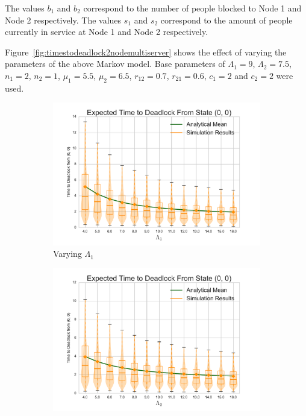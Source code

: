 \documentclass{article}
\numberwithin{equation}{section}
\begin{document}
The values $b_1$ and $b_2$ correspond to the number of people blocked to Node 1 and Node 2 respectively.
The values $s_1$ and $s_2$ correspond to the amount of people currently in service at Node 1 and Node 2 respectively.

Figure~\ref{fig:timestodeadlock2nodemultiserver} shows the effect of varying the parameters of the above Markov model.
Base parameters of $\Lambda_1 = 9$, $\Lambda_2 = 7.5$, $n_1 = 2$, $n_2 = 1$, $\mu_1 = 5.5$, $\mu_2 = 6.5$, $r_{12} = 0.7$, $r_{21} = 0.6$, $c_1 = 2$ and $c_2 = 2$ were used.

\begin{figure}[!htbp]
  \begin{subfigure}[b]{0.333\textwidth}
    \includegraphics[width=\textwidth]{images/varyL1_2Nms}
    \caption{Varying $\Lambda_1$}
    \label{fig:2Nms_L1}
  \end{subfigure}
  \begin{subfigure}[b]{0.333\textwidth}
    \includegraphics[width=\textwidth]{images/varyL2_2Nms}

\end{subfigure}
\end{figure}
\end{document}
